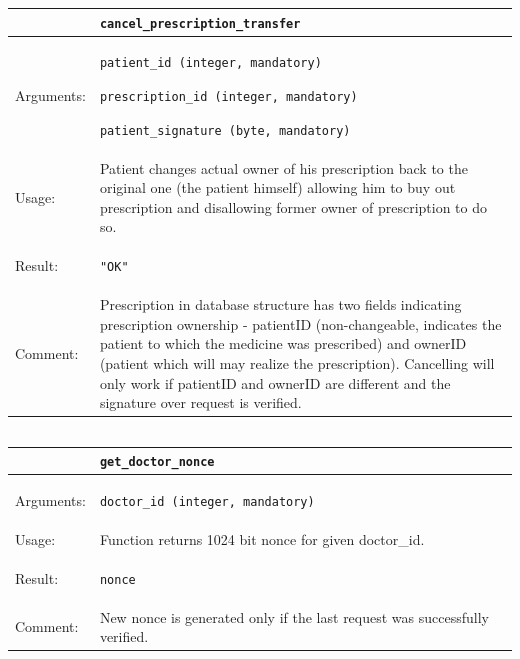     \begin{longtable}{| p{3cm} | p{10.75cm} |}
    \hline
     & \texttt{cancel\_prescription\_transfer} \\ \hline
    Arguments: &  \begin{packed_enum}
    	\item \texttt{patient\_id (integer, mandatory)}
		\item \texttt{prescription\_id (integer, mandatory)}
		\item \texttt{patient\_signature (byte, mandatory)}
	\end{packed_enum}     \\ \hline
    Usage: & Patient changes actual owner of his prescription back to the original one (the patient himself) allowing him to buy out prescription and disallowing former owner of prescription to do so. \\ \hline
    Result: & \begin{packed_enum}
    	\item \texttt{"OK"}
	\end{packed_enum}     \\ \hline	
		Comment: & Prescription in database structure has two fields indicating prescription ownership - patientID (non-changeable, indicates the patient to which the medicine was prescribed) and ownerID (patient which will may realize the prescription). Cancelling will only work if patientID and ownerID are different and the signature over request is verified. \\ \hline
    \end{longtable}

\subsection{}


    \begin{longtable}{| p{3cm} | p{10.75cm} |}
    \hline
     & \texttt{get\_doctor\_nonce} \\ \hline
    Arguments: &  \begin{packed_enum}
    	\item \texttt{doctor\_id (integer, mandatory)}
	\end{packed_enum}     \\ \hline
    Usage: & Function returns 1024 bit nonce for given doctor\_id. \\ \hline
    Result: & \begin{packed_enum}
    	\item \texttt{nonce}
	\end{packed_enum}     \\ \hline	
			Comment: & New nonce is generated only if the last request was successfully verified.\\ \hline
    \end{longtable}


